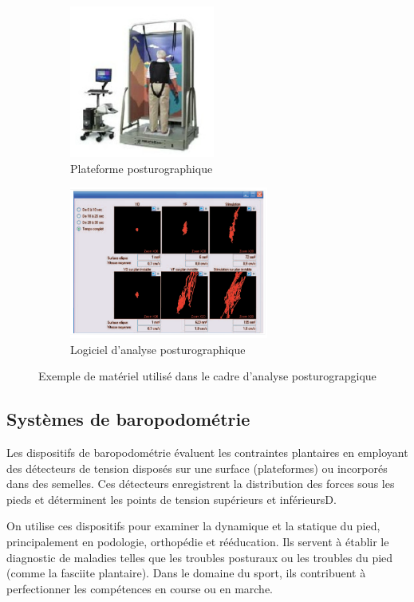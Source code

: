 \begin{figure}[ht]
  \centering
  \begin{subfigure}[b]{0.45\textwidth}
    \centering
    \includegraphics[height=5cm]{images/plateforme-posturographie.png}
    \caption{Plateforme posturographique}\label{fig:plateforme_posturographie}
  \end{subfigure}
  \begin{subfigure}[b]{0.45\textwidth}
    \centering
    \includegraphics[height=5cm, width=\textwidth]{images/logiciel-analyse-posturographique.png}
    \caption{Logiciel d'analyse posturographique}\label{fig:logiciel_analyse_posturographique}
  \end{subfigure}
  \caption{Exemple de matériel utilisé dans le cadre d'analyse posturograpgique}\label{fig:exemple_posturographie}
\end{figure}

\subsection{Systèmes de baropodométrie}
Les dispositifs de baropodométrie évaluent les contraintes plantaires en employant des détecteurs de tension disposés sur une surface (plateformes) ou incorporés dans des semelles. 
Ces détecteurs enregistrent la distribution des forces sous les pieds et déterminent les points de tension supérieurs et inférieursD.

On utilise ces dispositifs pour examiner la dynamique et la statique du pied, principalement en podologie, orthopédie et rééducation. 
Ils servent à établir le diagnostic de maladies telles que les troubles posturaux ou les troubles du pied (comme la fasciite plantaire). 
Dans le domaine du sport, ils contribuent à perfectionner les compétences en course ou en marche.

